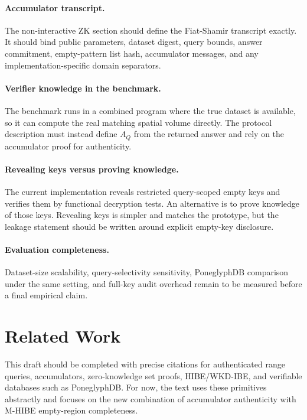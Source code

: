 \documentclass[11pt]{article}
\begin{document}
\paragraph{Accumulator transcript.}
The non-interactive ZK section should define the Fiat-Shamir transcript exactly. It should bind public parameters, dataset digest, query bounds, answer commitment, empty-pattern list hash, accumulator messages, and any implementation-specific domain separators.

\paragraph{Verifier knowledge in the benchmark.}
The benchmark runs in a combined program where the true dataset is available, so it can compute the real matching spatial volume directly. The protocol description must instead define $A_Q$ from the returned answer and rely on the accumulator proof for authenticity.

\paragraph{Revealing keys versus proving knowledge.}
The current implementation reveals restricted query-scoped empty keys and verifies them by functional decryption tests. An alternative is to prove knowledge of those keys. Revealing keys is simpler and matches the prototype, but the leakage statement should be written around explicit empty-key disclosure.

\paragraph{Evaluation completeness.}
Dataset-size scalability, query-selectivity sensitivity, PoneglyphDB comparison under the same setting, and full-key audit overhead remain to be measured before a final empirical claim.

\section{Related Work}

This draft should be completed with precise citations for authenticated range queries, accumulators, zero-knowledge set proofs, HIBE/WKD-IBE, and verifiable databases such as PoneglyphDB. For now, the text uses these primitives abstractly and focuses on the new combination of accumulator authenticity with M-HIBE empty-region completeness.
\end{document}
